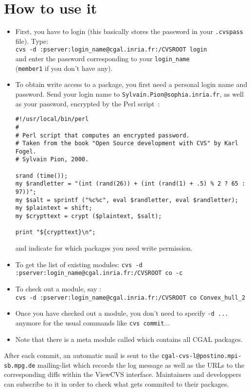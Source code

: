 \section{How to use it}
\label{sec:cvs_how_to}

\begin{itemize}
\item
    First, you have to login (this basically stores the password in your
    \texttt{.cvspass} file). Type: \\
    \texttt{cvs -d :pserver:login\_name@cgal.inria.fr:/CVSROOT login} \\
    and enter the password corresponding to your \texttt{login\_name} \\
    (\texttt{member1} if you don't have any).
\item
    To obtain write access to a package, you first need a personal login
    name and password.  Send your login name to 
    {\texttt{Sylvain.Pion@sophia.inria.fr}}, as well as your password,
    encrypted by the Perl script~:
\begin{verbatim}
#!/usr/local/bin/perl
#
# Perl script that computes an encrypted password.
# Taken from the book "Open Source development with CVS" by Karl Fogel.
# Sylvain Pion, 2000.

srand (time());
my $randletter = "(int (rand(26)) + (int (rand(1) + .5) % 2 ? 65 : 97))";
my $salt = sprintf ("%c%c", eval $randletter, eval $randletter);
my $plaintext = shift;
my $crypttext = crypt ($plaintext, $salt);

print "${crypttext}\n";
\end{verbatim}

    and indicate for which packages you need write permission.
\item
    To get the list of existing modules:
    \texttt{cvs -d :pserver:login\_name@cgal.inria.fr:/CVSROOT co -c}
\item
    To check out a module, say : \\
    \texttt{cvs -d :pserver:login\_name@cgal.inria.fr:/CVSROOT co
    Convex\_hull\_2}
\item
    Once you have checked out a module, you don't need to specify
    \texttt{-d ...} anymore for the usual commands like \texttt{cvs commit}...
\item
    Note that there is a meta module called  which contains all CGAL
    packages.
\end{itemize}

After each commit, an automatic mail is sent to the
\texttt{cgal-cvs-l@postino.mpi-sb.mpg.de} mailing-list which records
the log message as well as the URLs to the corresponding diffs within
the ViewCVS interface.  Maintainers and developpers can subscribe
to it in order to check what gets commited to their packages.

